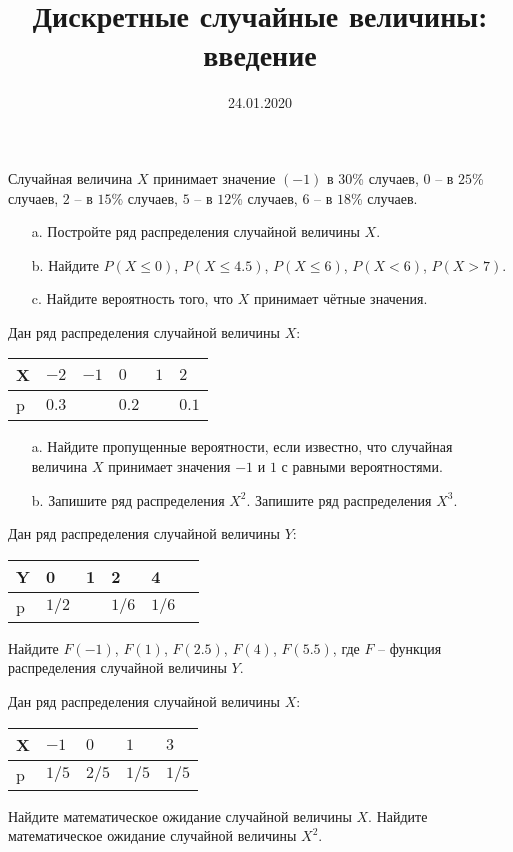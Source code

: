 \documentclass[a4paper, 12pt]{article}
\title{Дискретные случайные величины: введение}
\date{24.01.2020}
\begin{document}
\begin{problem} 
Случайная величина $X$ принимает значение $(-1)$ в $30$\% случаев, 
$0$ -- в $25$\% случаев, $2$ -- в $15$\% случаев, $5$ -- в $12$\% случаев, 
$6$ -- в $18$\% случаев.  
\begin{itemize}
\item[a.] Постройте ряд распределения случайной величины $X$.
\item[b.] Найдите $P(X\leqslant0)$, $P(X\leqslant4.5)$, $P(X\leqslant6)$, $P(X<6)$, $P(X>7)$.
\item[c.] Найдите вероятность того, что $X$ принимает чётные значения.
\end{itemize}
\end{problem}

\begin{problem}
Дан ряд распределения случайной величины $X$:
\begin{center}
\begin{tabular}{|p{1cm}|p{1cm}|p{1cm}|p{1cm}|p{1cm}|p{1cm}|}
\hline
X & $-2$ & $-1$ & $0$ & $1$ & $2$\\
\hline
p & $0.3$ &$ $ & $0.2$  & $ $ & $0.1$\\
\hline
\end{tabular}
\end{center}
\begin{itemize}
\item[a.] Найдите пропущенные вероятности, если известно, 
что случайная величина $X$ принимает значения $-1$ и $1$ с равными вероятностями.
\item[b.] Запишите ряд распределения $X^2$. Запишите ряд распределения $X^3$.
\end{itemize}
\end{problem}

\begin{problem}
Дан ряд распределения случайной величины $Y$:
\begin{center}
\renewcommand*{\arraystretch}{1.3}
\begin{tabular}{|p{1cm}|p{1cm}|p{1cm}|p{1cm}|p{1cm}|p{1cm}|}
\hline
Y & 0 & 1 & 2 & 4\\
\hline
p & $1/2$ &$ $ & $1/6$  & $1/6$ \\
\hline
\end{tabular}
\end{center}
Найдите $F(-1)$, $F(1)$, $F(2.5)$, $F(4)$, $F(5.5)$, где $F$ -- 
функция распределения случайной величины $Y$. 
\end{problem}

\begin{problem}
Дан ряд распределения случайной величины $X$:
\begin{center}
\renewcommand*{\arraystretch}{1.3}
\begin{tabular}{|p{1cm}|p{1cm}|p{1cm}|p{1cm}|p{1cm}|}
\hline
X & $-1$ & $0$ & $1$ & $3$\\
\hline
p & $1/5$ & $2/5$  & $1/5$  & $1/5$ \\
\hline
\end{tabular}
\end{center}
Найдите математическое ожидание случайной величины $X$. 
Найдите математическое ожидание случайной величины $X^2$.
\end{problem}
\end{document}
